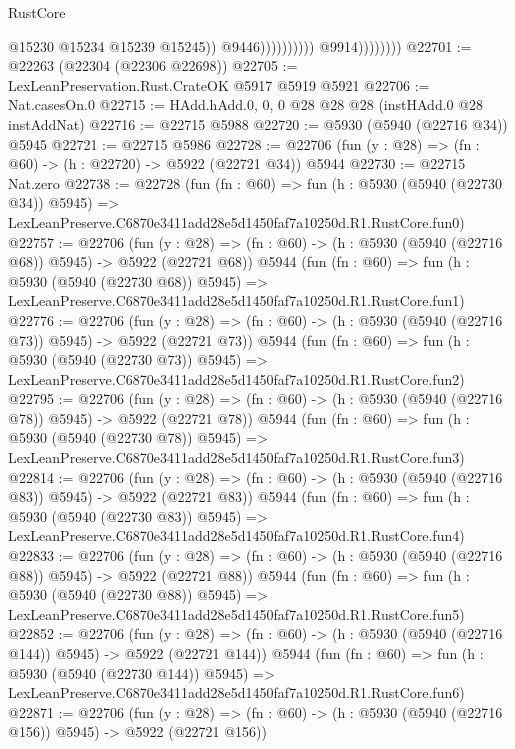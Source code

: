 \begin{lexlean}{RustCore}
\begin{coremodule}
                                            @15230
                                            @15234
                                            @15239
                                            @15245))
                                        @9446))))))))))
                    @9914))))))))
@22701 := @22263 (@22304 (@22306 @22698))
@22705 := LexLeanPreservation.Rust.CrateOK @5917 @5919 @5921
@22706 := Nat.casesOn.{0}
@22715 := HAdd.hAdd.{0, 0, 0} @28 @28 @28 (instHAdd.{0} @28 instAddNat)
@22716 := @22715 @5988
@22720 := @5930 (@5940 (@22716 @34)) @5945
@22721 := @22715 @5986
@22728 := @22706 (fun (y : @28) => (fn : @60) -> (h : @22720) -> @5922 (@22721 @34)) @5944
@22730 := @22715 Nat.zero
@22738 := @22728
    (fun (fn : @60) =>
    fun (h : @5930 (@5940 (@22730 @34)) @5945) =>
    LexLeanPreserve.C6870e3411add28e5d1450faf7a10250d.R1.RustCore.fun0)
@22757 := @22706
    (fun (y : @28) => (fn : @60) -> (h : @5930 (@5940 (@22716 @68)) @5945) -> @5922 (@22721 @68))
    @5944
    (fun (fn : @60) =>
    fun (h : @5930 (@5940 (@22730 @68)) @5945) =>
    LexLeanPreserve.C6870e3411add28e5d1450faf7a10250d.R1.RustCore.fun1)
@22776 := @22706
    (fun (y : @28) => (fn : @60) -> (h : @5930 (@5940 (@22716 @73)) @5945) -> @5922 (@22721 @73))
    @5944
    (fun (fn : @60) =>
    fun (h : @5930 (@5940 (@22730 @73)) @5945) =>
    LexLeanPreserve.C6870e3411add28e5d1450faf7a10250d.R1.RustCore.fun2)
@22795 := @22706
    (fun (y : @28) => (fn : @60) -> (h : @5930 (@5940 (@22716 @78)) @5945) -> @5922 (@22721 @78))
    @5944
    (fun (fn : @60) =>
    fun (h : @5930 (@5940 (@22730 @78)) @5945) =>
    LexLeanPreserve.C6870e3411add28e5d1450faf7a10250d.R1.RustCore.fun3)
@22814 := @22706
    (fun (y : @28) => (fn : @60) -> (h : @5930 (@5940 (@22716 @83)) @5945) -> @5922 (@22721 @83))
    @5944
    (fun (fn : @60) =>
    fun (h : @5930 (@5940 (@22730 @83)) @5945) =>
    LexLeanPreserve.C6870e3411add28e5d1450faf7a10250d.R1.RustCore.fun4)
@22833 := @22706
    (fun (y : @28) => (fn : @60) -> (h : @5930 (@5940 (@22716 @88)) @5945) -> @5922 (@22721 @88))
    @5944
    (fun (fn : @60) =>
    fun (h : @5930 (@5940 (@22730 @88)) @5945) =>
    LexLeanPreserve.C6870e3411add28e5d1450faf7a10250d.R1.RustCore.fun5)
@22852 := @22706
    (fun (y : @28) => (fn : @60) -> (h : @5930 (@5940 (@22716 @144)) @5945) -> @5922 (@22721 @144))
    @5944
    (fun (fn : @60) =>
    fun (h : @5930 (@5940 (@22730 @144)) @5945) =>
    LexLeanPreserve.C6870e3411add28e5d1450faf7a10250d.R1.RustCore.fun6)
@22871 := @22706
    (fun (y : @28) => (fn : @60) -> (h : @5930 (@5940 (@22716 @156)) @5945) -> @5922 (@22721 @156))

\end{coremodule}
\end{lexlean}
